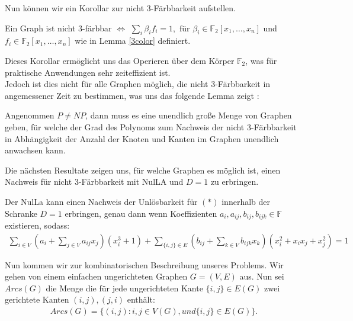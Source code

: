 \noindent Nun können wir ein Korollar zur nicht 3-Färbbarkeit aufstellen.

\begin{corollary}
Ein Graph ist nicht 3-färbbar $\Leftrightarrow$ $\sum_i \beta_if_i = 1, \text{ für } \beta_i \in \mathbb{F}_2[x_1,\ldots,x_n]$ und $f_i \in \mathbb{F}_2[x_1,\ldots,x_n]$ wie in Lemma \ref{3color} definiert. 
\end{corollary}

\noindent Dieses Korollar ermöglicht uns das Operieren über dem Körper $\mathbb{F}_2$, was für praktische Anwendungen sehr zeiteffizient ist. \cite{Loera2011} \\

\noindent Jedoch ist dies nicht für alle Graphen möglich, die nicht 3-Färbbarkeit in angemessener Zeit zu bestimmen, was uns das folgende Lemma zeigt \cite{Loera2009}:

\begin{lemma}
Angenommen $P \not = NP$, dann muss es eine unendlich große Menge von Graphen geben, für welche der Grad des Polynoms zum Nachweis der nicht 3-Färbbarkeit in Abhängigkeit der Anzahl der Knoten und Kanten im Graphen unendlich anwachsen kann.
\end{lemma}

Die nächsten Resultate zeigen uns, für welche Graphen es möglich ist, einen Nachweis für nicht 3-Färbbarkeit mit NulLA und $D=1$ zu erbringen. 

\begin{definition} \label{Polynomdarstellung}
Der NulLa kann einen Nachweis der Unlösbarkeit für $(\ast)$ innerhalb der Schranke $D=1$ erbringen, genau dann wenn Koeffizienten $a_i, a_{ij}, b_{ij},b_{ijk} \in \mathbb{F}$ existieren, sodass:
\begin{align*}
\sum_{i \in V}\left(a_i + \sum_{j\in V}a_{ij}x_j\right)(x_i^3+1)+\sum_{\{i,j\}\in E}\left(b_{ij}+\sum_{k\in V}b_{ijk}x_k\right)(x_i^2+x_ix_j+x_j^2)=1
\end{align*}
\end{definition}

\noindent Nun kommen wir zur kombinatorischen Beschreibung unseres Problems. Wir gehen von einem einfachen ungerichteten Graphen $G=(V,E)$ aus. Nun sei $Arcs(G)$ die Menge die für jede ungerichteten Kante $\{i,j\}\in E(G)$ zwei gerichtete Kanten $(i,j),(j,i)$ enthält:
\begin{align*}
Arcs(G) = \{(i,j):i,j \in V(G), und \{i,j\}\in E(G)\}.
\end{align*}
 
